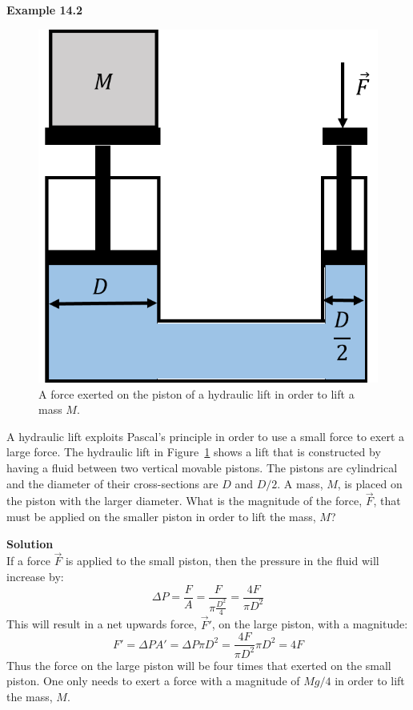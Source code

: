 \begin{framed}
\textbf{Example 14.2}\\
\begin{figure}[!htbp]
\centering
\includegraphics[width=0.4\linewidth]{files/lift-44b21302d3cbe001ed1715eb06d547c5.png}
\caption[]{A force exerted on the piston of a hydraulic lift in order to lift a mass $M$.}
\label{fig:fluidmechanics:lift}
\end{figure}

A hydraulic lift exploits Pascal's principle in order to use a small force to exert a large force. The hydraulic lift in Figure~\ref{fig:fluidmechanics:lift} shows a lift that is constructed by having a fluid between two vertical movable pistons. The pistons are cylindrical and the diameter of their cross-sections are $D$ and $D/2$. A mass, $M$, is placed on the piston with the larger diameter. What is the magnitude of the force, $\vec F$, that must be applied on the smaller piston in order to lift the mass, $M$?

\begin{framed}
\textbf{Solution}\\
If a force $\vec F$ is applied to the small piston, then the pressure in the fluid will increase by:
\begin{equation}
\Delta P = \frac{F}{A}=\frac{F}{\pi \frac{D^2}{4}}=\frac{4F}{\pi D^2}
\end{equation}
This will result in a net upwards force, $\vec F'$, on the large piston, with a magnitude:
\begin{equation}
F' = \Delta P A' = \Delta P \pi D^2 = \frac{4F}{\pi D^2} \pi D^2 = 4F
\end{equation}
Thus the force on the large piston will be four times that exerted on the small piston. One only needs to exert a force with a magnitude of $Mg/4$ in order to lift the mass, $M$.
\end{framed}
\end{framed}

